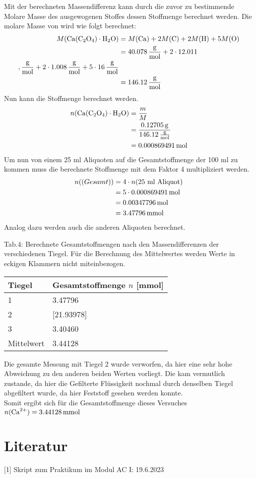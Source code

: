 \documentclass[12pt]{scrartcl} %
\begin{document}
Mit der berechneten Massendifferenz kann durch die zuvor zu bestimmende Molare Masse des ausgewogenen Stoffes dessen Stoffmenge berechnet werden.
Die molare Masse von  wird wie folgt berechnet:
\begin{align*}
  M(\ce{Ca(C2O4)\cdot H2O}) &= M(\ce{Ca}) + 2 M(\ce{C}) + 2 M(\ce{H}) + 5 M(\ce{O})\\
  &= 40.078\,\mathrm{\frac{g}{mol}} + 2\cdot  12.011\\,\mathrm{\frac{g}{mol}} + 2\cdot 1.008\,\mathrm{\frac{g}{mol}} + 5\cdot 16\,\mathrm{\frac{g}{mol}}\\
  &= 146.12\,\mathrm{\frac{g}{mol}}
\end{align*}
Nun kann die Stoffmenge berechnet werden.
\begin{align*}
  n(\ce{Ca(C2O4)\cdot H2O}) &= \frac{m}{M}\\
  &= \frac{0.12705\,\mathrm{g}}{146.12\,\mathrm{\frac{g}{mol}}}\\
  &= 0.000869491\,\mathrm{mol}
\end{align*}
Um nun von einem 25 ml Aliquoten auf die Gesamtstoffmenge der 100 ml zu kommen muss die berechnete Stoffmenge mit dem Faktor 4 multipliziert werden.
\begin{align*}
  n(\text(Gesamt)) &= 4 \cdot n(\text{25 ml  Aliquot})\\
  &= 5 \cdot 0.000869491\,\mathrm{mol}\\
  &= 0.00347796\,\mathrm{mol}\\
  &= 3.47796\,\mathrm{mmol}
\end{align*}
Analog dazu werden auch die anderen Aliquoten berechnet.\\
\begin{center}
  Tab.4: Berechnete Gesamtstoffmengen nach den Massendifferenzen der verschiedenen Tiegel. Für die Berechnung des Mittelwertes werden Werte in eckigen Klammern nicht miteinbezogen.\\
  \begin{tabular}{l l}
    \hline
    Tiegel & Gesamtstoffmenge $n$ [mmol]\\
    \hline
    1&3.47796\\
    2&[21.93978]\\
    3&3.40460\\
    \hline
    Mittelwert & 3.44128\\
    \hline
  \end{tabular}
\end{center}

Die gesamte Messung mit Tiegel 2 wurde verworfen, da hier eine sehr hohe Abweichung zu den anderen beiden Werten vorliegt. Die kam vermutlich zustande, da hier die Gefilterte Flüssigkeit nochmal durch denselben Tiegel abgefiltert wurde, da hier Feststoff gesehen werden konnte.\\
Somit ergibt sich für die Gesamtstoffmenge dieses Versuches $n(\ce{Ca^{2+}}) = 3.44128\,\mathrm{mmol}$

\section{Literatur}
[1] Skript zum Praktikum im Modul AC I: 19.6.2023
\end{document}
